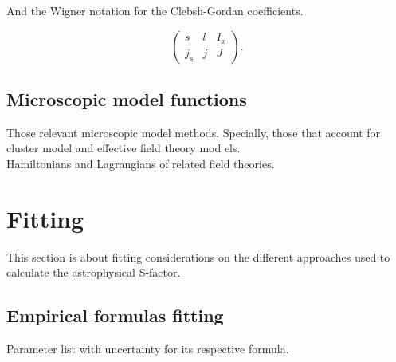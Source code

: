 \documentclass[openany]{book}
\begin{document}
And the Wigner notation for the Clebsh-Gordan coefficients.

\begin{equation} \label{eq:angularMomentum_wignerCoefficients}
	\left(\begin{array}{ccc}
		s &	l &	I_x \\
		j_s & j & J
	\end{array}\right).
\end{equation}

\section{Microscopic model functions} \label{sec:microscopicalFunctions}

Those relevant microscopic model methods. Specially, those that account for cluster model and effective field theory mod	els. \\

Hamiltonians and Lagrangians of related field theories.

\chapter{Fitting} \label{ap:fitting}

This section is about fitting considerations on the different approaches used to calculate the astrophysical S-factor.

\section{Empirical formulas fitting} \label{sec:empiricalFitting}

Parameter list with uncertainty for its respective formula. 
\end{document}
